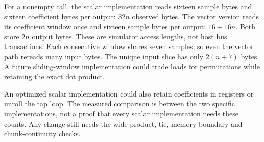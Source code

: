 For a nonempty call, the scalar implementation reads sixteen sample bytes and sixteen
coefficient bytes per output: \(32n\) observed bytes. The vector version reads its
coefficient window once and sixteen sample bytes per output: \(16+16n\). Both store
\(2n\) output bytes. These are simulator access lengths, not host bus transactions.
Each consecutive window shares seven samples, so even the vector path rereads many
input bytes. The unique input slice has only \(2(n+7)\) bytes. A future sliding-window
implementation could trade loads for permutations while retaining the exact dot product.

An optimized scalar implementation could also retain coefficients in registers or
unroll the tap loop. The measured comparison is between the two specific implementations,
not a proof that every scalar implementation needs these counts. Any change still needs
the wide-product, tie, memory-boundary and chunk-continuity checks.
